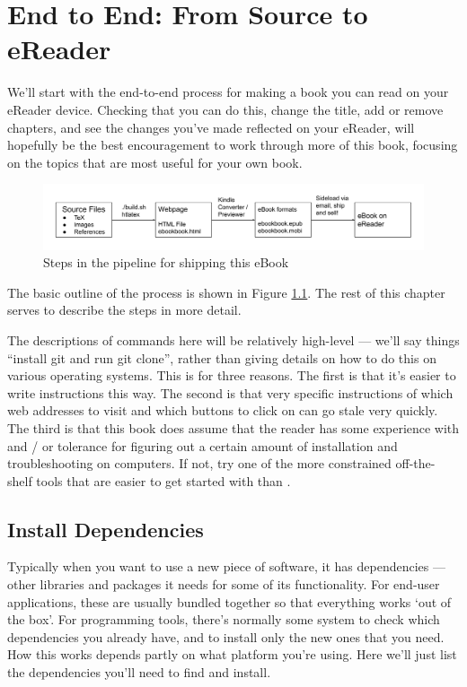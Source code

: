 
\chapter{End to End: From Source to eReader}

We'll start with the end-to-end process for making a book you can read
on your eReader device. Checking that you can do this, change the title,
add or remove chapters, and see the changes you've made reflected on your 
eReader, will hopefully be the best encouragement to work through more
of this book, focusing on the topics that are most useful for your own book.

\begin{figure}
\begin{center}
\includegraphics[width=1.2\linewidth]{images/pipeline.png}
\caption{Steps in the pipeline for shipping this eBook}
\end{center}
\label{fig:pipeline}
\end{figure}

The basic outline of the process is shown in Figure \ref{fig:pipeline}.
The rest of this chapter serves to describe the steps in more detail.

The descriptions of commands here will be relatively high-level ---
we'll say things ``install git and run git clone'', rather than giving
details on how to do this on various operating systems. This is for
three reasons. The first is that it's easier to write instructions
this way. The second is that very specific instructions of which web
addresses to visit and which buttons to click on can go stale very
quickly. The third is that this book does assume that the reader has
some experience with and / or tolerance for figuring out a certain
amount of installation and troubleshooting on computers. If not, try one of the
more constrained off-the-shelf tools that are easier to get started with
than \latex. 

\section{Install Dependencies}

Typically when you want to use a new piece of software, it has
dependencies --- other libraries and packages it needs for some of its
functionality. For end-user applications, these are usually bundled
together so that everything works `out of the box'. For programming
tools, there's normally some system to check which dependencies you
already have, and to install only the new ones that you need. How this
works depends partly on what platform you're using. Here we'll just list
the dependencies you'll need to find and install.

